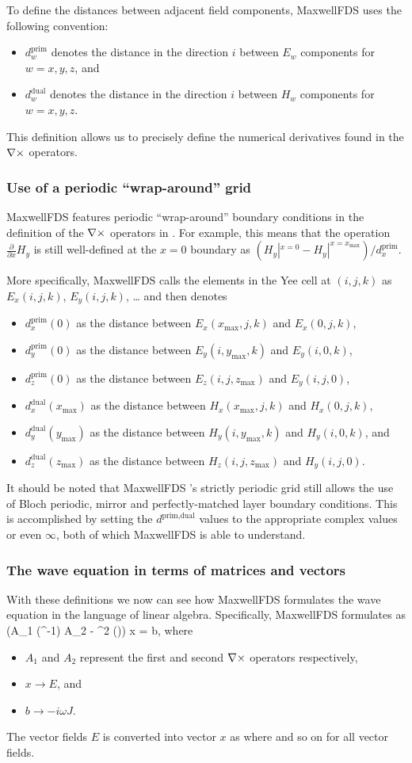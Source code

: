 \documentclass{article}
\newcommand{\MaxwellFDS}{MaxwellFDS }
\newcommand{\BI}{\begin{itemize}\item}
\newcommand{\EI}{\end{itemize}}
\newcommand{\I}{\item}
\newcommand{\pf}[1]{\frac{\partial}{\partial #1}} %
\newcommand{\prim}{\text{prim}}
\newcommand{\dual}{\text{dual}}
\newcommand{\mx}{\text{max}}
\newcommand{\diag}{\text{diag}}
\begin{document}
To define the distances between adjacent field components,
    \MaxwellFDS uses the following convention:
    \BI $d^\prim_{w}$ denotes the distance in the direction $i$
        between $E_w$ components for $w = x, y, z$, and
    \I  $d^\dual_{w}$ denotes the distance in the direction $i$
        between $H_w$ components for $w = x, y, z$. \EI
This definition allows us to precisely define the numerical derivatives
    found in the $\nabla\times$ operators.
    
\subsubsection{Use of a periodic ``wrap-around'' grid}
\MaxwellFDS features periodic ``wrap-around'' boundary conditions
    in the definition of the $\nabla\times$ operators in .
For example, this means that the operation $\pf{x}H_y$ is still well-defined
    at the $x=0$ boundary as 
    $(H_y|^{x=0} - H_y|^{x = x_\mx}) / d^\prim_x$.

More specifically, \MaxwellFDS calls the elements 
    in the Yee cell at $(i,j,k)$ as $E_x(i,j,k)$, $E_y(i,j,k)$, \ldots 
    and then denotes 
\BI $d^\prim_x(0)$ as the distance 
    between $E_x(x_\mx,j,k)$ and $E_x(0,j,k)$,
\I  $d^\prim_y(0)$ as the distance 
    between $E_y(i,y_\mx,k)$ and $E_y(i,0,k)$,
\I  $d^\prim_z(0)$ as the distance 
    between $E_z(i,j,z_\mx)$ and $E_y(i,j,0)$,
\I  $d^\dual_x(x_\mx)$ as the distance 
    between $H_x(x_\mx,j,k)$ and $H_x(0,j,k)$,
\I  $d^\dual_y(y_\mx)$ as the distance 
    between $H_y(i,y_\mx,k)$ and $H_y(i,0,k)$, and
\I  $d^\dual_z(z_\mx)$ as the distance 
    between $H_z(i,j,z_\mx)$ and $H_y(i,j,0)$. \EI

It should be noted that \MaxwellFDS's strictly periodic grid still
    allows the use of Bloch periodic, mirror and perfectly-matched layer
    boundary conditions.
This is accomplished by setting the $d^{\prim,\dual}$ values to 
    the appropriate complex values or even $\infty$,
    both of which \MaxwellFDS is able to understand.
    
\subsubsection{The wave equation in terms of matrices and vectors}
With these definitions we now can see how \MaxwellFDS
    formulates the wave equation in the language of linear algebra.
Specifically, \MaxwellFDS formulates  as
    {(A_1 \diag(\mu^{-1}) A_2 - \omega^2 \diag(\epsilon)) x = b,}
    where
    \BI $A_1$ and $A_2$ represent the first and second $\nabla\times$ operators
        respectively,
    \I  $x \to E$, and
    \I  $b \to -i \omega J$. \EI

The vector fields $E$ is converted into vector $x$ as
    where
\E{}{e_w = \begin{bmatrix} E_w(0,0,0) \\ E_w(1,0,0) \\
                        \vdots \\ E_w(x_\mx, y_\mx, z_\mx) \end{bmatrix},}
and so on for all vector fields.
\end{document}
